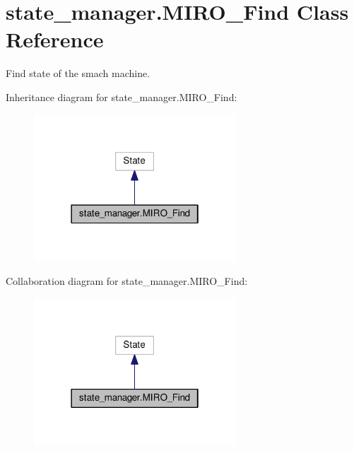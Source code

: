 \hypertarget{classstate__manager_1_1MIRO__Find}{}\section{state\+\_\+manager.\+M\+I\+R\+O\+\_\+\+Find Class Reference}
\label{classstate__manager_1_1MIRO__Find}


Find state of the smach machine.  




Inheritance diagram for state\+\_\+manager.\+M\+I\+R\+O\+\_\+\+Find\+:\nopagebreak
\begin{figure}[H]
\begin{center}
\leavevmode
\includegraphics[width=214pt]{classstate__manager_1_1MIRO__Find__inherit__graph}
\end{center}
\end{figure}


Collaboration diagram for state\+\_\+manager.\+M\+I\+R\+O\+\_\+\+Find\+:\nopagebreak
\begin{figure}[H]
\begin{center}
\leavevmode
\includegraphics[width=214pt]{classstate__manager_1_1MIRO__Find__coll__graph}
\end{center}
\end{figure}
